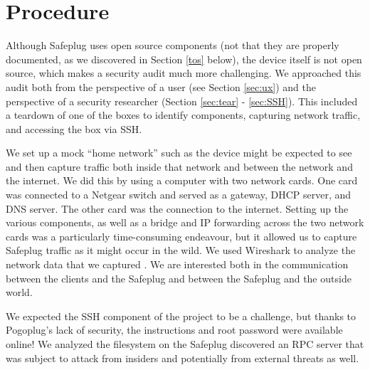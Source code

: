 \section{Procedure}
\label{sec:proc}
Although Safeplug uses open source components (not that they are properly documented, as we discovered in Section \ref{tos} below), the device itself is not open source, which makes a security audit much more challenging.  We approached this audit both from the perspective of a user (see Section \ref{sec:ux}) and the perspective of a security researcher (Section \ref{sec:tear} - \ref{sec:SSH}).  This included a teardown of one of the boxes to identify components, capturing network traffic, and accessing the box via SSH.

We set up a mock ``home network'' such as the device might be expected to see and then capture traffic both inside that network and between the network and the internet.  We did this by using a computer with two network cards.  One card was connected to a Netgear switch and served as a gateway, DHCP server, and DNS server.  The other card was the connection to the internet.  Setting up the various components, as well as a bridge and IP forwarding across the two network cards was a particularly time-consuming endeavour, but it allowed us to capture Safeplug traffic as it might occur in the wild.  We used Wireshark to analyze the network data that we captured \cite{wireshark}.  We are interested both in the communication between the clients and the Safeplug and between the Safeplug and the outside world. 

We expected the SSH component of the project to be a challenge, but thanks to Pogoplug's lack of security, the instructions and root password were available online!  We analyzed the filesystem on the Safeplug discovered an RPC server that was subject to attack from insiders and potentially from external threats as well.
